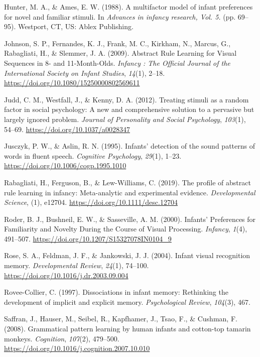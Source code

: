 \documentclass[english,man,man,floatsintext]{apa6}
\begin{document}
\leavevmode\hypertarget{ref-hunter1988}{}%
Hunter, M. A., \& Ames, E. W. (1988). A multifactor model of infant preferences for novel and familiar stimuli. In \emph{Advances in infancy research, Vol. 5.} (pp. 69--95). Westport, CT, US: Ablex Publishing.

\leavevmode\hypertarget{ref-johnson2009}{}%
Johnson, S. P., Fernandes, K. J., Frank, M. C., Kirkham, N., Marcus, G., Rabagliati, H., \& Slemmer, J. A. (2009). Abstract Rule Learning for Visual Sequences in 8- and 11-Month-Olds. \emph{Infancy : The Official Journal of the International Society on Infant Studies}, \emph{14}(1), 2--18. \url{https://doi.org/10.1080/15250000802569611}

\leavevmode\hypertarget{ref-judd2012}{}%
Judd, C. M., Westfall, J., \& Kenny, D. A. (2012). Treating stimuli as a random factor in social psychology: A new and comprehensive solution to a pervasive but largely ignored problem. \emph{Journal of Personality and Social Psychology}, \emph{103}(1), 54--69. \url{https://doi.org/10.1037/a0028347}

\leavevmode\hypertarget{ref-jusczyk1995}{}%
Jusczyk, P. W., \& Aslin, R. N. (1995). Infants' detection of the sound patterns of words in fluent speech. \emph{Cognitive Psychology}, \emph{29}(1), 1--23. \url{https://doi.org/10.1006/cogp.1995.1010}

\leavevmode\hypertarget{ref-rabagliati2019}{}%
Rabagliati, H., Ferguson, B., \& Lew-Williams, C. (2019). The profile of abstract rule learning in infancy: Meta-analytic and experimental evidence. \emph{Developmental Science}, (1), e12704. \url{https://doi.org/10.1111/desc.12704}

\leavevmode\hypertarget{ref-roder2000}{}%
Roder, B. J., Bushneil, E. W., \& Sasseville, A. M. (2000). Infants' Preferences for Familiarity and Novelty During the Course of Visual Processing. \emph{Infancy}, \emph{1}(4), 491--507. \url{https://doi.org/10.1207/S15327078IN0104_9}

\leavevmode\hypertarget{ref-rose2004}{}%
Rose, S. A., Feldman, J. F., \& Jankowski, J. J. (2004). Infant visual recognition memory. \emph{Developmental Review}, \emph{24}(1), 74--100. \url{https://doi.org/10.1016/j.dr.2003.09.004}

\leavevmode\hypertarget{ref-rovee-collier1997}{}%
Rovee-Collier, C. (1997). Dissociations in infant memory: Rethinking the development of implicit and explicit memory. \emph{Psychological Review}, \emph{104}(3), 467.

\leavevmode\hypertarget{ref-saffran2008}{}%
Saffran, J., Hauser, M., Seibel, R., Kapfhamer, J., Tsao, F., \& Cushman, F. (2008). Grammatical pattern learning by human infants and cotton-top tamarin monkeys. \emph{Cognition}, \emph{107}(2), 479--500. \url{https://doi.org/10.1016/j.cognition.2007.10.010}
\end{document}
